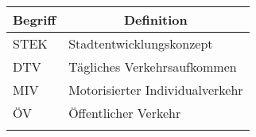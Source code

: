 %
%
%
%

\begin{longtable}[c]{ll}
\toprule 
Begriff		        & \multicolumn{1}{c}{Definition}        \\ 
\midrule
STEK				& Stadtentwicklungskonzept   \\
DTV                 & Tägliches Verkehrsaufkommen    \\
MIV					& Motorisierter Individualverkehr       \\ 
ÖV					& Öffentlicher Verkehr \\

\label{tab:Glossary}
\end{longtable}




%


